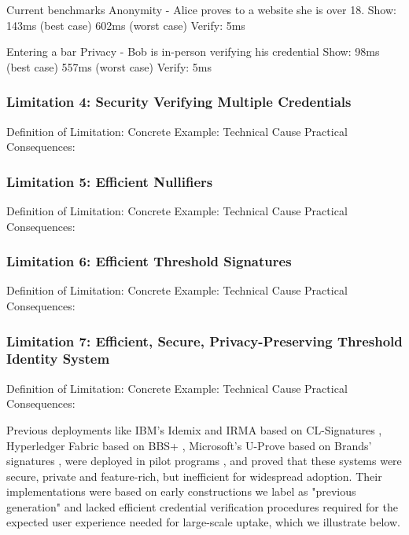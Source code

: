 Current benchmarks
Anonymity - Alice proves to a website she is over 18.
Show: 143ms (best case) 602ms (worst case)
Verify: 5ms

Entering a bar
Privacy - Bob is in-person verifying his credential
Show: 98ms (best case) 557ms (worst case)
Verify: 5ms


\subsubsection{Limitation 4: Security Verifying Multiple Credentials}
Definition of Limitation: 
Concrete Example:
Technical Cause
Practical Consequences:


\subsubsection{Limitation 5: Efficient Nullifiers}
Definition of Limitation: 
Concrete Example:
Technical Cause
Practical Consequences:




\subsubsection{Limitation 6: Efficient Threshold Signatures}
Definition of Limitation: 
Concrete Example:
Technical Cause
Practical Consequences:


\subsubsection{Limitation 7: Efficient, Secure, Privacy-Preserving Threshold Identity System}
Definition of Limitation: 
Concrete Example:
Technical Cause
Practical Consequences:















Previous deployments like IBM's Idemix \cite{camenisch_design_2002} and IRMA \cite{fischer-hubner_towards_2013} based on CL-Signatures \cite{camenisch_design_2002, cimato_signature_2003}, Hyperledger Fabric \cite{androulaki_hyperledger_2018} based on BBS+ \cite{hutchison_constant-size_2006}, Microsoft's U-Prove \cite{dunkelman_formal_2016} based on Brands' signatures \cite{brands_rethinking_2000}, were deployed in pilot programs \cite{dunkelman_formal_2016}, and proved that these systems were secure, private and feature-rich, but inefficient for widespread adoption. Their implementations were based on early constructions we label as "previous generation" and lacked efficient credential verification procedures required for the expected user experience needed for large-scale uptake, which we illustrate below.

